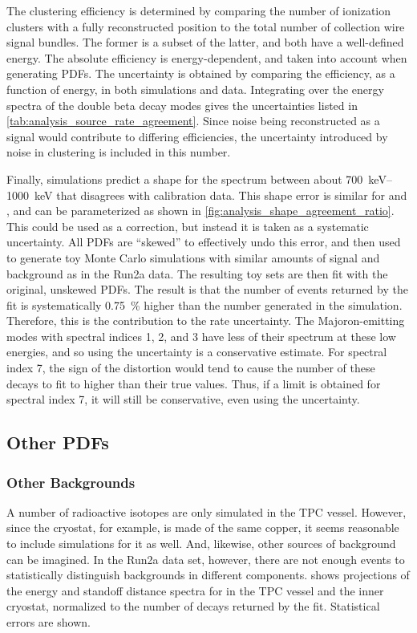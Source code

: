\documentclass[herrin-thesis.tex]{subfiles}
\begin{document}
The clustering efficiency is determined by comparing the number of ionization clusters with a fully reconstructed position to the total number of collection wire signal bundles. The former is a subset of the latter, and both have a well-defined energy. The absolute efficiency is energy-dependent, and taken into account when generating PDFs. The uncertainty is obtained by comparing the efficiency, as a function of energy, in both simulations and data. Integrating over the energy spectra of the double beta decay modes gives the uncertainties listed in \cref{tab:analysis_source_rate_agreement}. Since noise being reconstructed as a signal would contribute to differing efficiencies, the uncertainty introduced by noise in clustering is included in this number.

Finally, simulations predict a shape for the spectrum between about \SIrange{700}{1000}{\keV} that disagrees with calibration data. This shape error is similar for  and , and can be parameterized as shown in \cref{fig:analysis_shape_agreement_ratio}. This could be used as a correction, but instead it is taken as a systematic uncertainty. All PDFs are ``skewed'' to effectively undo this error, and then used to generate toy Monte Carlo simulations with similar amounts of signal and background as in the Run2a data. The resulting toy sets are then fit with the original, unskewed PDFs. The result is that the number of \twonu{} events returned by the fit is systematically \SI{0.75}{\percent} higher than the number generated in the simulation. Therefore, this is the contribution to the \twonu{} rate uncertainty. The Majoron-emitting modes with spectral indices 1, 2, and 3 have less of their spectrum at these low energies, and so using the \twonu{} uncertainty is a conservative estimate. For spectral index 7, the sign of the distortion would tend to cause the number of these decays to fit to higher than their true values. Thus, if a limit is obtained for spectral index 7, it will still be conservative, even using the \twonu{} uncertainty.

\subsection{Other PDFs}
\subsubsection{Other Backgrounds}
A number of radioactive isotopes are only simulated in the TPC vessel. However, since the cryostat, for example, is made of the same copper, it seems reasonable to include simulations for it as well. And, likewise, other sources of background can be imagined. In the Run2a data set, however, there are not enough events to statistically distinguish backgrounds in different components.  shows projections of the energy and standoff distance spectra for  in the TPC vessel and the inner cryostat, normalized to the number of  decays returned by the fit. Statistical errors are shown.
 
\end{document}
